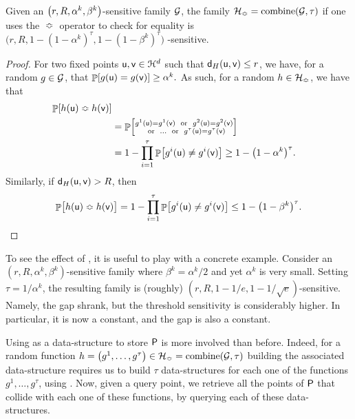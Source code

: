 \begin{lemma}
    Given an $\pth[]{r, R, \alpha^k, \beta^k}$-sensitive family
    $\mathcal{G}$, the family $\FamilyAmp = \kFunctions{\FamilyB}{\tau}$
    if one uses the ${}\Bumpeq{}$ operator to check for equality is
    \begin{math}
        \bigl(r, R, 1 - (1-\alpha^k)^\tau, 1 - (1-\beta^k)^\tau\bigr)
    \end{math}%
    -sensitive.
\end{lemma}
\begin{proof}
    For two fixed points $\mathsf{u}, \mathsf{v} \in \EuScript{H}^d$ such that
    $\distH{\pntA}{\pntB} \leq r$, we have, for a random
    $g \in \mathcal{G}$, that
    \begin{math}
        \Prob{g(\pntA) = g(\pntB) } \allowbreak \geq \alpha^k.
    \end{math}
     As such,
    for a random $h \in \mathcal{H}_{\Bumpeq}$, we have that
    \begin{align*}
      \Prob{\MakeSBig \WEqual{h(\pntA)}{ h(\pntB) }}%
      \\
      &= \Prob{ \substack{ g^1(\pntA) = g^1(\pntB) \text{~ or ~} g^2(\pntA) =
        g^2(\pntB) \\ \text{~ or ~} \ldots \text{~ or ~} g^\tau(\pntA)
        = g^\tau(\pntB)}}%
      \\
      &=%
        1 - \prod_{i=1}^\tau \Prob{g^i(\pntA) \neq g^i(\pntB)}
        \geq%
        1 - \bigl(1-\alpha^k\bigr)^\tau.
    \end{align*}
    Similarly, if $\distH{\pntA}{\pntB} > R$, then
    \begin{align*}
      \Prob{\bigl. \WEqual{h(\pntA)}{ h(\pntB)} }%
      =%
      1 - \prod_{i=1}^\tau \Prob{g^i(\pntA) \neq g^i(\pntB)} \leq 1
      - \bigl(1 - \beta^k \bigr)^\tau.
    \end{align*}
\end{proof}

To see the effect of , it is useful to play with a
concrete example. Consider an $(r,R,\alpha^k,\beta^k)$-sensitive
family where $\beta^k = \alpha^k/2$ and yet $\alpha^k$ is very
small. Setting $\tau = 1/\alpha^k$, the resulting family is (roughly)
$(r, R, 1-1/e, 1-1/\sqrt{e})$-sensitive. Namely, the gap shrank, but
the threshold sensitivity is considerably higher. In particular, it is
now a constant, and the gap is also a constant.

Using  as a data-structure to store ${\mathsf{P}}$ is
more involved than before. Indeed, for a random function $h =
\pth{g^1, \ldots, g^\tau} \in \FamilyAmp =
\kFunctions{\FamilyB}{\tau}$ building the associated data-structure
requires us to build $\tau$ data-structures for each one of the
functions $g^1,\ldots, g^\tau$, using . Now, given a
query point, we retrieve all the points of ${\mathsf{P}}$ that collide with
each one of these functions, by querying each of these
data-structures.

